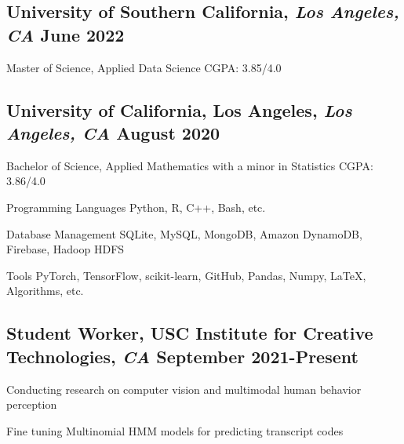 \documentclass[11pt]{article}
\begin{document}
\subsection*{University of Southern California{\normalfont, \textit{Los Angeles, CA} \hfill June 2022}}
\noindent
Master of Science, Applied Data Science
\hfill
CGPA: 3.85/4.0

\vspace{0.1in}

\subsection*{University of California, Los Angeles{\normalfont, \textit{Los Angeles, CA} \hfill August 2020}}
\noindent
Bachelor of Science, Applied Mathematics with a minor in Statistics
\hfill
CGPA: 3.86/4.0

\vspace{0.1in}

\begin{compactdesc}
    \item[Programming Languages] Python, R, C++, Bash, etc.
    \item[Database Management] SQLite, MySQL, MongoDB, Amazon DynamoDB, Firebase, Hadoop HDFS
    \item[Tools] PyTorch, TensorFlow, scikit-learn, GitHub, Pandas, Numpy, \LaTeX,
    Algorithms, etc.
\end{compactdesc}
\vspace{0.1in}

\subsection*{Student Worker{\normalfont, USC Institute for Creative
            Technologies,
            \textit{CA} \hfill
            September 2021-Present}}
\begin{compactitem}
    \item Conducting research on computer vision and multimodal
    human behavior perception
    \item Fine tuning Multinomial HMM models for predicting transcript codes
\end{compactitem}
\vspace{0.1in}
\end{document}
